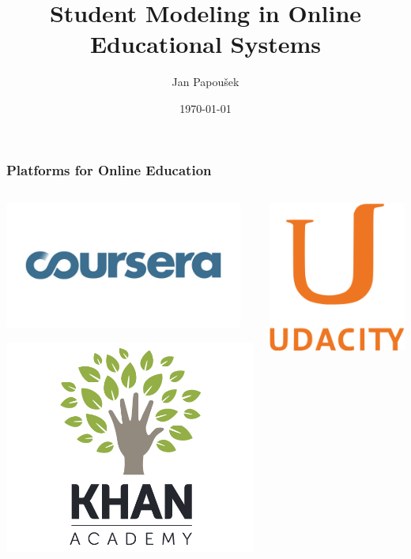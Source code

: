 \documentclass[xcolor=svgnames]{beamer}
\title[Student Modeling]{Student Modeling in Online Educational Systems}
\author{Jan Papoušek}
\institute{Masaryk University Brno}
\date{\today}
\begin{document}
\frame[plain]{\titlepage}
\begin{frame}
	\frametitle{Platforms for Online Education}

	\begin{columns}[2]
		\begin{center}
			\includegraphics[width=0.95\textwidth]{2013-VV041-student-modeling/coursera.jpg}

			\includegraphics[width=.7\textwidth]{2013-VV041-student-modeling/khanacademy.png}
		\end{center}
		\begin{center}
			\includegraphics[width=.5\textwidth]{2013-VV041-student-modeling/udacity.png}


\end{center}
\end{columns}
\end{frame}
\end{document}
